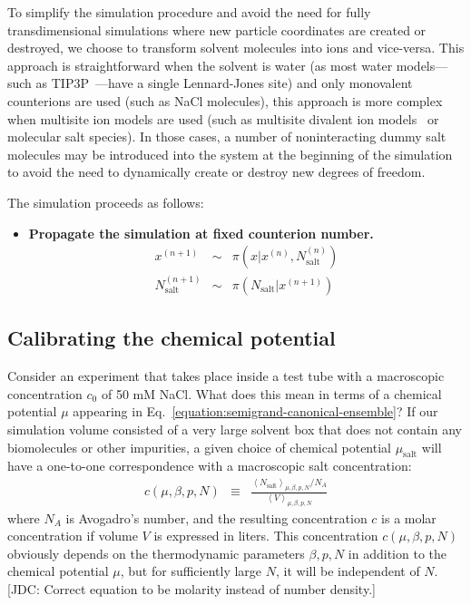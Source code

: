 \documentclass[aps,pre,twocolumn,nofootinbib,superscriptaddress,linenumbers,11point]{revtex4-1}
\begin{document}
To simplify the simulation procedure and avoid the need for fully transdimensional simulations where new particle coordinates are created or destroyed, we choose to transform solvent molecules into ions and vice-versa.
This approach is straightforward when the solvent is water (as most water models---such as TIP3P~\cite{tip3p}---have a single Lennard-Jones site) and only monovalent counterions are used (such as NaCl molecules), this approach is more complex when multisite ion models are used (such as multisite divalent ion models~\cite{multisite-ions} or molecular salt species).
In those cases, a number of noninteracting dummy salt molecules may be introduced into the system at the beginning of the simulation to avoid the need to dynamically create or destroy new degrees of freedom.

The simulation proceeds as follows:
\begin{itemize}
  \item {\bf Propagate the simulation at fixed counterion number.}
  \begin{eqnarray}
  x^{(n+1)} &\sim& \pi(x | x^{(n)}, N_\mathrm{salt}^{(n)})  \\
  N_\mathrm{salt}^{(n+1)} &\sim& \pi(N_\mathrm{salt} | x^{(n+1)})   
  \end{eqnarray}
\end{itemize}

\subsection*{Calibrating the chemical potential}

Consider an experiment that takes place inside a test tube with a macroscopic concentration $c_0$ of 50 mM NaCl.
What does this mean in terms of a chemical potential $\mu$ appearing in Eq.~\ref{equation:semigrand-canonical-ensemble}?
If our simulation volume consisted of a very large solvent box that does not contain any biomolecules or other impurities, a given choice of chemical potential $\mu_\mathrm{salt}$ will have a one-to-one correspondence with a macroscopic salt concentration:
\begin{eqnarray}
c(\mu, \beta, p, N) &\equiv& \frac{\left< N_\mathrm{salt} \right>_{\mu, \beta, p, N} / N_A}{\left< V \right>_{\mu, \beta, p, N}}
\end{eqnarray}
where $N_A$ is Avogadro's number, and the resulting concentration $c$ is a molar concentration if volume $V$ is expressed in liters.
This concentration $c(\mu, \beta, p, N)$ obviously depends on the thermodynamic parameters $\beta, p, N$ in addition to the chemical potential $\mu$, but for sufficiently large $N$, it will be independent of $N$.
{\color{red}[JDC: Correct equation to be molarity instead of number density.]}
\end{document}
